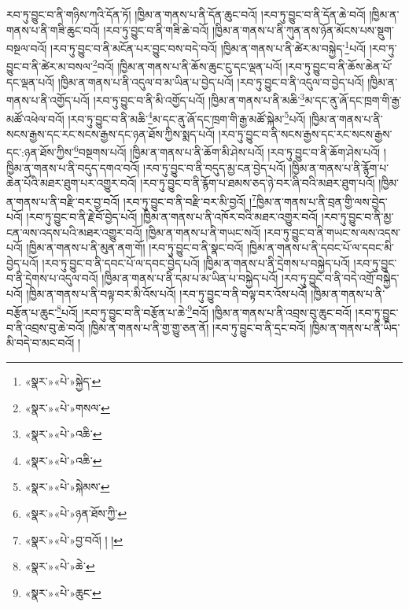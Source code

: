 རབ་ཏུ་བྱུང་བ་ནི་གཉིས་ཀའི་དོན་ཏོ། །ཁྱིམ་ན་གནས་པ་ནི་དོན་ཆུང་བའོ། །རབ་ཏུ་བྱུང་བ་ནི་དོན་ཆེ་བའོ། །ཁྱིམ་ན་གནས་པ་ནི་གཟི་ཆུང་བའོ། །རབ་ཏུ་བྱུང་བ་ནི་གཟི་ཆེ་བའོ། །ཁྱིམ་ན་གནས་པ་ནི་ཀུན་ནས་ཉོན་མོངས་པས་སྡུག་བསྔལ་བའོ། །རབ་ཏུ་བྱུང་བ་ནི་མངོན་པར་བྱུང་བས་བདེ་བའོ། །ཁྱིམ་ན་གནས་པ་ནི་ཚེར་མ་བསྐྱེད་\footnote{«སྣར་»«པེ་»སྐྱེད་}པའོ། །རབ་ཏུ་བྱུང་བ་ནི་ཚེར་མ་བསལ་\footnote{«སྣར་»«པེ་»གསལ་}བའོ། །ཁྱིམ་ན་གནས་པ་ནི་ཆོས་ཆུང་ངུ་དང་ལྡན་པའོ། །རབ་ཏུ་བྱུང་བ་ནི་ཆོས་ཆེན་པོ་དང་ལྡན་པའོ། །ཁྱིམ་ན་གནས་པ་ནི་འདུལ་བ་མ་ཡིན་པ་བྱེད་པའོ། །རབ་ཏུ་བྱུང་བ་ནི་འདུལ་བ་བྱེད་པའོ། །ཁྱིམ་ན་གནས་པ་ནི་འགྱོད་པའོ། །རབ་ཏུ་བྱུང་བ་ནི་མི་འགྱོད་པའོ། །ཁྱིམ་ན་གནས་པ་ནི་མཆི་\footnote{«སྣར་»«པེ་»འཆི་}མ་དང་ནུ་ཞོ་དང་ཁྲག་གི་རྒྱ་མཚོ་འཕེལ་བའོ། །རབ་ཏུ་བྱུང་བ་ནི་མཆི་\footnote{«སྣར་»«པེ་»འཆི་}མ་དང་ནུ་ཞོ་དང་ཁྲག་གི་རྒྱ་མཚོ་སྐེམ་\footnote{«སྣར་»«པེ་»སྐེམས་}པའོ། །ཁྱིམ་ན་གནས་པ་ནི་སངས་རྒྱས་དང་རང་སངས་རྒྱས་དང་ཉན་ཐོས་ཀྱིས་སྨད་པའོ། །རབ་ཏུ་བྱུང་བ་ནི་སངས་རྒྱས་དང་རང་སངས་རྒྱས་དང་:ཉན་ཐོས་ཀྱིས་\footnote{«སྣར་»«པེ་»ཉན་ཐོས་ཀྱི་}བསྔགས་པའོ། །ཁྱིམ་ན་གནས་པ་ནི་ཆོག་མི་ཤེས་པའོ། །རབ་ཏུ་བྱུང་བ་ནི་ཆོག་ཤེས་པའོ། །ཁྱིམ་ན་གནས་པ་ནི་བདུད་དགའ་བའོ། །རབ་ཏུ་བྱུང་བ་ནི་བདུད་མྱ་ངན་བྱེད་པའོ། །ཁྱིམ་ན་གནས་པ་ནི་རྙོག་པ་ཆེན་པོའི་མཐར་ཐུག་པར་འགྱུར་བའོ། །རབ་ཏུ་བྱུང་བ་ནི་རྙོག་པ་ཐམས་ཅད་ཉེ་བར་ཞི་བའི་མཐར་ཐུག་པའོ། །ཁྱིམ་ན་གནས་པ་ནི་བརྫི་བར་བྱ་བའོ། །རབ་ཏུ་བྱུང་བ་ནི་བརྫི་བར་མི་བྱའོ། །\footnote{«སྣར་»«པེ་»བྱ་བའོ། ། །}ཁྱིམ་ན་གནས་པ་ནི་བྲན་གྱི་ལས་བྱེད་པའོ། །རབ་ཏུ་བྱུང་བ་ནི་རྗེ་བོ་བྱེད་པའོ། །ཁྱིམ་ན་གནས་པ་ནི་འཁོར་བའི་མཐར་འགྱུར་བའོ། །རབ་ཏུ་བྱུང་བ་ནི་མྱ་ངན་ལས་འདས་པའི་མཐར་འགྱུར་བའོ། །ཁྱིམ་ན་གནས་པ་ནི་གཡང་སའོ། །རབ་ཏུ་བྱུང་བ་ནི་གཡང་ས་ལས་འདས་པའོ། །ཁྱིམ་ན་གནས་པ་ནི་མུན་ནག་གོ། །རབ་ཏུ་བྱུང་བ་ནི་སྣང་བའོ། །ཁྱིམ་ན་གནས་པ་ནི་དབང་པོ་ལ་དབང་མི་བྱེད་པའོ། །རབ་ཏུ་བྱུང་བ་ནི་དབང་པོ་ལ་དབང་བྱེད་པའོ། །ཁྱིམ་ན་གནས་པ་ནི་དྲེགས་པ་བསྐྱེད་པའོ། །རབ་ཏུ་བྱུང་བ་ནི་དྲེགས་པ་འདུལ་བའོ། །ཁྱིམ་ན་གནས་པ་ནི་དམ་པ་མ་ཡིན་པ་བསྐྱེད་པའོ། །རབ་ཏུ་བྱུང་བ་ནི་བདེ་འགྲོ་བསྐྱེད་པའོ། །ཁྱིམ་ན་གནས་པ་ནི་བལྟ་བར་མི་འོས་པའོ། །རབ་ཏུ་བྱུང་བ་ནི་བལྟ་བར་འོས་པའོ། །ཁྱིམ་ན་གནས་པ་ནི་བརྩོན་པ་ཆུང་\footnote{«སྣར་»«པེ་»ཆེ་}པའོ། །རབ་ཏུ་བྱུང་བ་ནི་བརྩོན་པ་ཆེ་\footnote{«སྣར་»«པེ་»ཆུང་}བའོ། །ཁྱིམ་ན་གནས་པ་ནི་འབྲས་བུ་ཆུང་བའོ། །རབ་ཏུ་བྱུང་བ་ནི་འབྲས་བུ་ཆེ་བའོ། །ཁྱིམ་ན་གནས་པ་ནི་གྱ་གྱུ་ཅན་ནོ། །རབ་ཏུ་བྱུང་བ་ནི་དྲང་བའོ། །ཁྱིམ་ན་གནས་པ་ནི་ཡིད་མི་བདེ་བ་མང་བའོ། །
